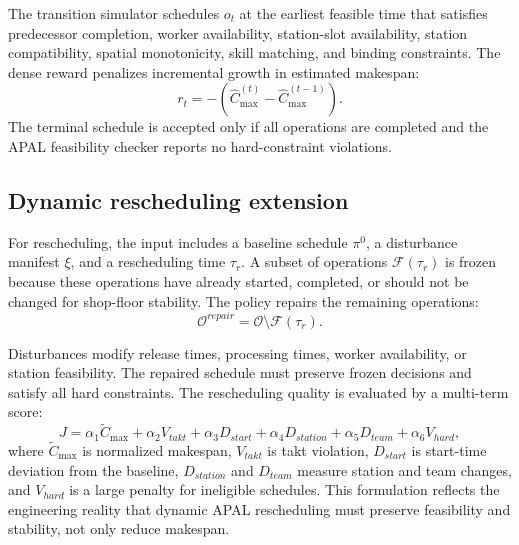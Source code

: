 The transition simulator schedules $o_t$ at the earliest feasible time that satisfies predecessor completion, worker availability, station-slot availability, station compatibility, spatial monotonicity, skill matching, and binding constraints. The dense reward penalizes incremental growth in estimated makespan:
\begin{equation}
  r_t = -(\widehat{C}_{\max}^{(t)}-\widehat{C}_{\max}^{(t-1)}).
\end{equation}
The terminal schedule is accepted only if all operations are completed and the APAL feasibility checker reports no hard-constraint violations.

\subsection{Dynamic rescheduling extension}

For rescheduling, the input includes a baseline schedule $\pi^0$, a disturbance manifest $\xi$, and a rescheduling time $\tau_r$. A subset of operations $\mathcal{F}(\tau_r)$ is frozen because these operations have already started, completed, or should not be changed for shop-floor stability. The policy repairs the remaining operations:
\begin{equation}
  \mathcal{O}^{repair} = \mathcal{O}\setminus \mathcal{F}(\tau_r).
\end{equation}

Disturbances modify release times, processing times, worker availability, or station feasibility. The repaired schedule must preserve frozen decisions and satisfy all hard constraints. The rescheduling quality is evaluated by a multi-term score:
\begin{equation}
  J = \alpha_1 \widetilde{C}_{\max}
      + \alpha_2 V_{takt}
      + \alpha_3 D_{start}
      + \alpha_4 D_{station}
      + \alpha_5 D_{team}
      + \alpha_6 V_{hard},
\end{equation}
where $\widetilde{C}_{\max}$ is normalized makespan, $V_{takt}$ is takt violation, $D_{start}$ is start-time deviation from the baseline, $D_{station}$ and $D_{team}$ measure station and team changes, and $V_{hard}$ is a large penalty for ineligible schedules. This formulation reflects the engineering reality that dynamic APAL rescheduling must preserve feasibility and stability, not only reduce makespan.
